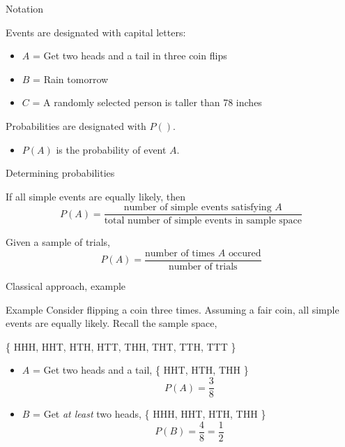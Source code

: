 \documentclass[xcolor=table, handout]{beamer}
\begin{document}
\begin{frame}{Notation}
\begin{block}{}
Events are designated with capital letters:
\pause
\begin{itemize}
\item $A$ = Get two heads and a tail in three coin flips
\item $B$ = Rain tomorrow
\item $C$ = A randomly selected person is taller than 78 inches
\end{itemize}
\end{block}

\pause
\begin{block}{}
Probabilities are designated with $P()$.
\pause
\begin{itemize}
\item $P(A)$ is the probability of event $A$.
\end{itemize}
\end{block}
\end{frame}

\begin{frame}{Determining probabilities}
\begin{block}{}
 If all simple events are equally likely, then
\[P(A) = \frac{\text{number of simple events satisfying } A}{\text{total number of simple events in sample space}}\] 
\end{block}

\pause

\begin{block}{}
 Given a sample of trials,
\[P(A) = \frac{\text{number of times } A \text{ occured}}{\text{number of trials}}\]
\end{block}

\end{frame}

\begin{frame}{Classical approach, example}
\begin{exampleblock}{Example}
Consider flipping a coin three times. Assuming a fair coin, all simple events are equally likely. Recall the sample space,\\
\smallskip
{\centering
\{ HHH, HHT, HTH, HTT, THH, THT, TTH, TTT \} \par
}
\begin{itemize}
\pause
\item $A$ = Get two heads and a tail, \{ HHT, HTH, THH \}
\pause
\[ P(A) = \frac 3 8\]

\pause
\item $B$ = Get \emph{at least} two heads,  \{ HHH,  HHT, HTH, THH \}
\pause
\[ P(B) = \frac 4 8 = \frac 1 2\]
\end{itemize}
\end{exampleblock}
\end{frame}
\end{document}
